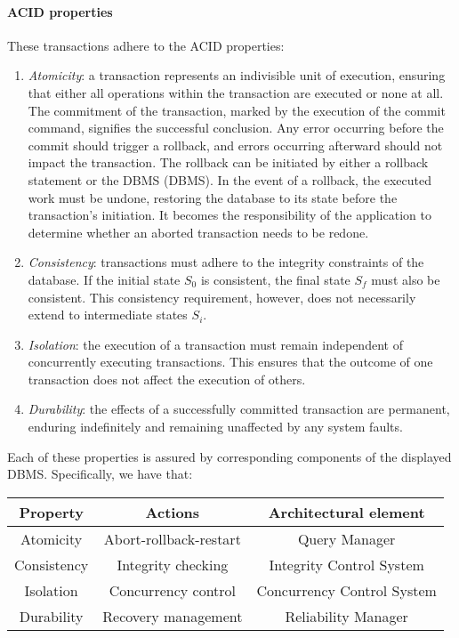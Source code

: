 \paragraph*{ACID properties}
These transactions adhere to the ACID properties:
\begin{enumerate}
    \item \textit{Atomicity}: a transaction represents an indivisible unit of execution, ensuring that either all operations within the transaction are executed or none at all.
        The commitment of the transaction, marked by the execution of the commit command, signifies the successful conclusion. 
        Any error occurring before the commit should trigger a rollback, and errors occurring afterward should not impact the transaction.        
        The rollback can be initiated by either a rollback statement or the DBMS (DBMS).
        In the event of a rollback, the executed work must be undone, restoring the database to its state before the transaction's initiation.
        It becomes the responsibility of the application to determine whether an aborted transaction needs to be redone.
    \item \textit{Consistency}: transactions must adhere to the integrity constraints of the database.
        If the initial state $S_0$ is consistent, the final state $S_f$ must also be consistent. 
        This consistency requirement, however, does not necessarily extend to intermediate states $S_i$.
    \item \textit{Isolation}: the execution of a transaction must remain independent of concurrently executing transactions. 
        This ensures that the outcome of one transaction does not affect the execution of others.
    \item \textit{Durability}: the effects of a successfully committed transaction are permanent, enduring indefinitely and remaining unaffected by any system faults.
\end{enumerate}
Each of these properties is assured by corresponding components of the displayed DBMS. 
Specifically, we have that:
\begin{table}[H]
    \centering
    \begin{tabular}{c|c|c}
    \textbf{Property} & \textbf{Actions}       & \textbf{Architectural element} \\ \hline
    Atomicity         & Abort-rollback-restart & Query Manager                  \\
    Consistency       & Integrity checking     & Integrity Control System       \\
    Isolation         & Concurrency control    & Concurrency Control System     \\
    Durability        & Recovery management    & Reliability Manager           
    \end{tabular}
\end{table}